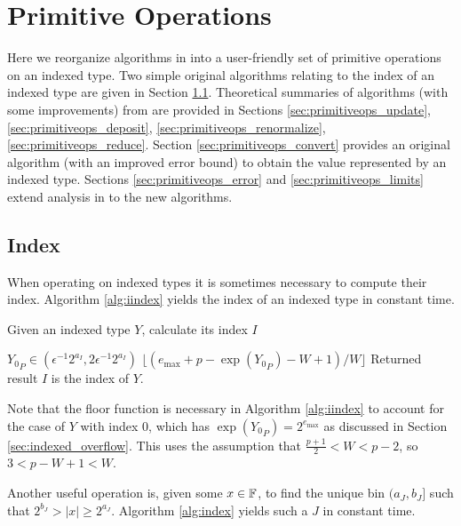 \section{Primitive Operations}
    \label{sec:primitiveops}
    Here we reorganize algorithms in \cite{repsum} into a user-friendly set of
    primitive operations on an indexed type. Two simple original algorithms
    relating to the index of an indexed type are given in Section
    \ref{sec:primitiveops_index}. Theoretical summaries of algorithms (with
    some improvements) from \cite{repsum} are provided in Sections
    \ref{sec:primitiveops_update}, \ref{sec:primitiveops_deposit},
    \ref{sec:primitiveops_renormalize}, \ref{sec:primitiveops_reduce}. Section
    \ref{sec:primitiveops_convert} provides an original algorithm (with an
    improved error bound) to obtain the value represented by an indexed type.
    Sections \ref{sec:primitiveops_error} and \ref{sec:primitiveops_limits}
    extend analysis in \cite{repsum} to the new algorithms.
  \subsection{Index}
    \label{sec:primitiveops_index}
    When operating on indexed types it is sometimes necessary to compute their
    index. Algorithm \ref{alg:iindex} yields the index of an indexed type in
    constant time.

    \begin{samepage}
    \begin{alg}
      Given an indexed type $Y$, calculate its index $I$
      \begin{algorithmic}[1]
        \Require
          \Statex ${Y_0}_P \in (\epsilon^{-1}  2^{a_{I}}, 2  \epsilon^{-1}  2^{a_I})$
          \State \Return $\lfloor(e_{\max} + p - \exp({Y_0}_P) - W + 1)/W\rfloor$
        \EndFunction
        \Ensure
          \Statex Returned result $I$ is the index of $Y$.
      \end{algorithmic}
      \label{alg:iindex}
    \end{alg}
    \end{samepage}

    Note that the floor function is necessary in Algorithm \ref{alg:iindex} to
    account for the case of $Y$ with index $0$, which has $\exp({Y_0}_P) =
    2^{e_{\max}}$ as discussed in Section \ref{sec:indexed_overflow}.  This
    uses the assumption that $\frac{p+1}{2} < W < p-2$, so $3 < p - W + 1 < W.$

    Another useful operation is, given some $x \in \mathbb{F}$, to find the unique bin
    $(a_J, b_J]$ such that $2^{b_J} > |x| \geq 2^{a_J}$. Algorithm
    \ref{alg:index} yields such a $J$ in constant time.

